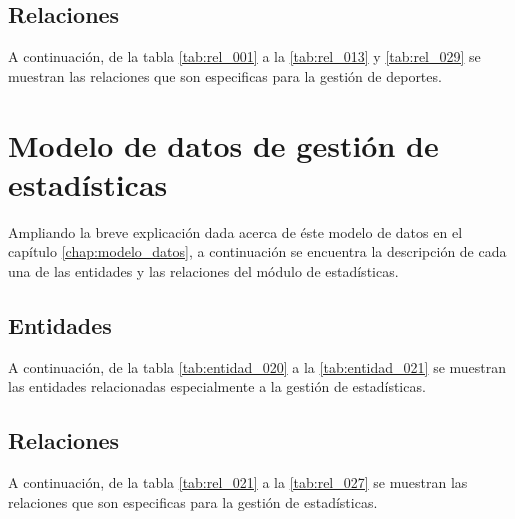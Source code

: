 \subsection{Relaciones}
A continuación, de la tabla \ref{tab:rel_001} a la \ref{tab:rel_013} y \ref{tab:rel_029} se muestran las relaciones que son especificas para la gestión de deportes.

\clearpage















\section{Modelo de datos de gestión de estadísticas}
Ampliando la breve explicación dada acerca de éste modelo de datos en el capítulo \ref{chap:modelo_datos}, a continuación se encuentra la descripción de cada una de las entidades y las relaciones del módulo de estadísticas.

\subsection{Entidades}
A continuación, de la tabla \ref{tab:entidad_020} a la \ref{tab:entidad_021} se muestran las entidades relacionadas especialmente a la gestión de estadísticas.

\clearpage



\subsection{Relaciones}
A continuación, de la tabla \ref{tab:rel_021} a la \ref{tab:rel_027} se muestran las relaciones que son especificas para la gestión de estadísticas.

